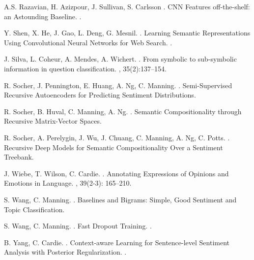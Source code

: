 \documentclass[11pt]{article}
\begin{document}
\begin{thebibliography}{}
A.S. Razavian, H. Azizpour, J. Sullivan, S. Carlsson
.
\newblock CNN Features off-the-shelf: an Astounding Baseline.
.

Y. Shen, X. He, J. Gao, L. Deng, G. Mesnil.
.
\newblock Learning Semantic Representations Using Convolutional Neural Networks for Web Search.
.

J. Silva, L. Coheur, A. Mendes, A. Wichert.
.
\newblock From symbolic to sub-symbolic information in question classification.
, 35(2):137--154.

R. Socher, J. Pennington, E. Huang, A. Ng, C. Manning.
.
\newblock Semi-Supervised Recursive Autoencoders for Predicting Sentiment Distributions.

R. Socher, B. Huval, C. Manning, A. Ng.
.
\newblock Semantic Compositionality through Recursive Matrix-Vector Spaces.

R. Socher, A. Perelygin, J. Wu, J. Chuang, C. Manning, A. Ng, C. Potts.
.
\newblock Recursive Deep Models for Semantic Compositionality Over a Sentiment Treebank.

J. Wiebe, T. Wilson, C. Cardie.
.
\newblock Annotating Expressions of Opinions and Emotions in Language.
, 39(2-3): 165--210.

S. Wang, C. Manning.
.
\newblock Baselines and Bigrams: Simple, Good Sentiment and Topic Classification.

S. Wang, C. Manning.
.
\newblock Fast Dropout Training.
.

B. Yang, C. Cardie.
.
\newblock Context-aware Learning for Sentence-level Sentiment Analysis with Posterior Regularization.
.


\end{thebibliography}
\end{document}
